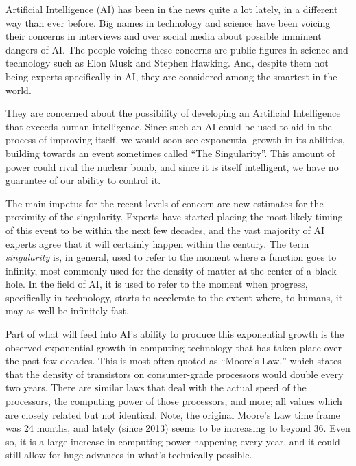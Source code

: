 \documentclass[12pt]{article} %
\begin{document}
Artificial Intelligence (AI) has been in the news quite a lot lately, in a different way than ever before. Big names in technology and science have been voicing their concerns in interviews and over social media about possible imminent dangers of AI. The people voicing these concerns are public figures in science and technology such as Elon Musk\cite{muskinterview} and Stephen Hawking\cite{hawkinginterview}. And, despite them not being experts specifically in AI, they are considered among the smartest in the world.

They are concerned about the possibility of developing an Artificial Intelligence that exceeds human intelligence. Since such an AI could be used to aid in the process of improving itself, we would soon see exponential growth in its abilities, building towards an event sometimes called ``The Singularity''\cite{wbw}. This amount of power could rival the nuclear bomb, and since it is itself intelligent, we have no guarantee of our ability to control it.

The main impetus for the recent levels of concern are new estimates for the proximity of the singularity. Experts have started placing the most likely timing of this event to be within the next few decades, and the vast majority of AI experts agree that it will certainly happen within the century\cite{wbw}. The term \textit{singularity} is, in general, used to refer to the moment where a function goes to infinity, most commonly used for the density of matter at the center of a black hole. In the field of AI, it is used to refer to the moment when progress, specifically in technology, starts to accelerate to the extent where, to humans, it may as well be infinitely fast.

Part of what will feed into AI's ability to produce this exponential growth is the observed exponential growth in computing technology that has taken place over the past few decades. This is most often quoted as ``Moore's Law,'' which states that the density of transistors on consumer-grade processors would double every two years. There are similar laws that deal with the actual speed of the processors, the computing power of those processors, and more; all values which are closely related but not identical. Note, the original Moore's Law time frame was 24 months, and lately (since 2013)\cite{mooresslowing} seems to be increasing to beyond 36. Even so, it is a large increase in computing power happening every year, and it could still allow for huge advances in what's technically possible.
\end{document}
